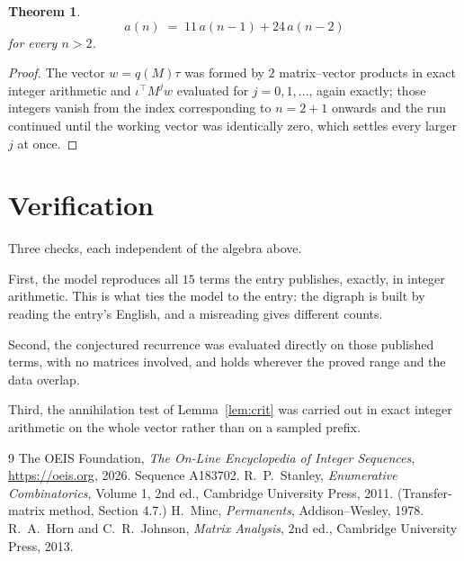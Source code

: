 \documentclass[11pt,a4paper]{article}
\theoremstyle{plain}
\newtheorem{theorem}{Theorem}
\theoremstyle{definition}
\begin{document}
\begin{theorem}
\[
a(n)\;=\;11\,a(n-1) + 24\,a(n-2)
\]
for every $n>2$.
\end{theorem}

\begin{proof}
The vector $w=q(M)\tau$ was formed by $2$ matrix--vector products in exact integer
arithmetic and $\iota^{\!\top}M^{j}w$ evaluated for $j=0,1,\dots$, again exactly; those
integers vanish from the index corresponding to $n=2+1$ onwards and the run continued
until the working vector was identically zero, which settles every larger $j$ at once.
\end{proof}

\section{Verification}

Three checks, each independent of the algebra above.

First, the model reproduces all $15$ terms the entry publishes, exactly, in integer
arithmetic. This is what ties the model to the entry: the digraph is built by reading the
entry's English, and a misreading gives different counts.

Second, the conjectured recurrence was evaluated directly on those published terms, with no
matrices involved, and holds wherever the proved range and the data overlap.

Third, the annihilation test of Lemma~\ref{lem:crit} was carried out in exact integer
arithmetic on the whole vector rather than on a sampled prefix.

\begin{thebibliography}{9}
 The OEIS Foundation, \emph{The On-Line Encyclopedia of Integer
Sequences}, \url{https://oeis.org}, 2026. Sequence A183702.
 R.~P.~Stanley, \emph{Enumerative Combinatorics}, Volume 1, 2nd ed.,
Cambridge University Press, 2011. (Transfer-matrix method, Section 4.7.)
 H.~Minc, \emph{Permanents}, Addison--Wesley, 1978.
 R.~A.~Horn and C.~R.~Johnson, \emph{Matrix Analysis}, 2nd ed., Cambridge
University Press, 2013.
\end{thebibliography}
\end{document}
